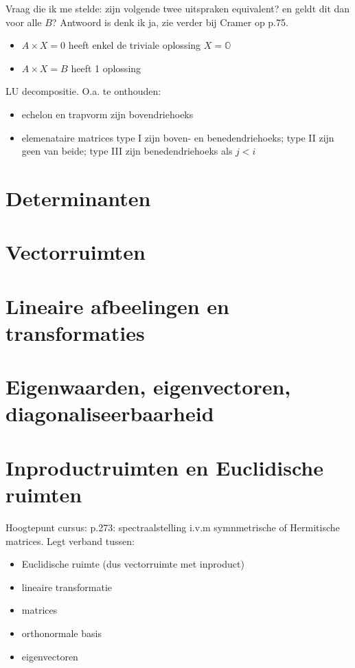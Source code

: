 \documentclass{article}
\begin{document}
Vraag die ik me stelde: zijn volgende twee uitspraken equivalent? en geldt dit dan voor alle $B$? Antwoord is denk ik ja, zie verder bij Cramer op p.75. 
\begin{itemize}
    \item $A\times X = 0$ heeft enkel de triviale oplossing $X=\mathbb{O}$
    \item $A \times X = B$ heeft 1 oplossing 
\end{itemize}

LU decompositie. O.a. te onthouden: 
\begin{itemize}
    \item echelon en trapvorm zijn bovendriehoeks
    \item elemenataire matrices type I zijn boven- en benedendriehoeks; type II zijn geen van beide; type III zijn benedendriehoeks als $j<i$
\end{itemize}


\section{Determinanten}

\section{Vectorruimten}

\section{Lineaire afbeelingen en transformaties}

\section{Eigenwaarden, eigenvectoren, diagonaliseerbaarheid}


\section{Inproductruimten en Euclidische ruimten}

Hoogtepunt cursus: p.273: spectraalstelling i.v.m symnmetrische of Hermitische matrices. 
Legt verband tussen: 
\begin{itemize}
    \item Euclidische ruimte (dus vectorruimte met inproduct)
    \item lineaire transformatie
    \item matrices
    \item orthonormale basis
    \item eigenvectoren
\end{itemize}
\end{document}
